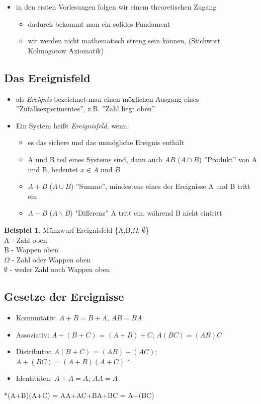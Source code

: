 \documentclass[10pt]{report}
\theoremstyle{definition}
\newtheorem{exmp}{Beispiel}
\begin{document}
\begin{itemize}
	\item in den ersten Vorlesungen folgen wir einem theoretischen Zugang
	\begin{itemize}
		\item dadurch bekommt man ein solides Fundament
		\item wir werden nicht mathematisch streng sein können, (Stichwort Kolmogorow Axiomatik)
	\end{itemize}
\end{itemize}
\subsection{Das Ereignisfeld}
\begin{itemize}
	\item als \textit{Ereignis} bezeichnet man einen möglichen Ausgang eines ''Zufallsexperimentes'', z.B. ''Zahl liegt oben''
	\item Ein System heißt \textit{Ereignisfeld}, wenn:
	\begin{itemize}
		\item es das sichere und das unmögliche Ereignis enthält

				\item A und B teil eines Systems sind, dann auch $AB$ ($A\cap B$) ''Produkt'' von A und B, bedeutet $x \in A \text{ und } B$
			\item $A+B$ ($A \cup B$) ''Summe'', mindestens eines der Ereignisse A und B tritt ein
			\item $A-B$ ($A\backslash B$) "Differenz'' A tritt ein, während B nicht eintritt

	
	\end{itemize}
\end{itemize}
\begin{exmp}
	Münzwurf Ereignisfeld \{A,B,$\Omega$, $\emptyset$\}\\
	A - Zahl oben\\B - Wappen oben \\ $\Omega$ - Zahl oder Wappen oben \\ $\emptyset$ - weder Zahl noch Wappen oben
\end{exmp}

\subsection{Gesetze der Ereignisse}
\begin{itemize}
	\item Kommutativ: $A+B = B+A$, $AB = BA$
	\item Assoziativ: $A+(B+C)$ = $(A+B)+C$; $A(BC) = (AB)C$
	\item Distributiv: $A(B+C)$ = $(AB)+(AC)$; $A+(BC) = (A+B)(A+C)$ *
	\item Identitäten: $A+A = A$; $AA = A$
\end{itemize}
*(A+B)(A+C) = AA+AC+BA+BC = A+(BC)
\end{document}
